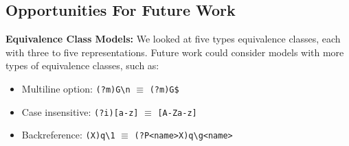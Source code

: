%
%

\subsection{Opportunities For Future Work}
\label{sec:futureequivclasses}
%
\noindent \textbf{Equivalence Class Models:}
We looked at five types equivalence classes, each with three to five representations.
Future work could consider models with more types of equivalence classes, such as:
%
\begin{itemize}[leftmargin=8pt] %
\item Multiline option: { \verb!(?m)G\n! $\equiv$ \verb!(?m)G$!}
\item Case insensitive: { \verb!(?i)[a-z]! $\equiv$ \verb![A-Za-z]!}
\item Backreference: { \verb!(X)q\1! $\equiv$ \verb!(?P<name>X)q\g<name>!}
\end{itemize}

